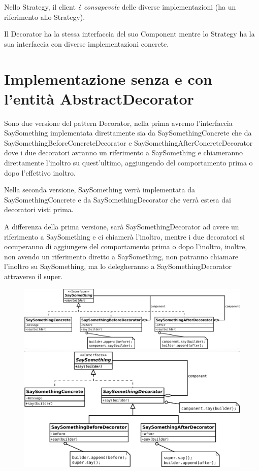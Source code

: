 Nello Strategy, il client \textit{è consapevole} delle diverse implementazioni (ha un riferimento allo Strategy).
\smallskip

Il Decorator ha la stessa interfaccia del suo Component mentre lo Strategy ha la sua interfaccia con diverse implementazioni concrete.

\section{Implementazione senza e con l'entità AbstractDecorator}

Sono due versione del pattern Decorator, nella prima avremo l'interfaccia SaySomething implementata direttamente sia da SaySomethingConcrete che da 
SaySomethingBeforeConcreteDecorator e SaySomethingAfterConcreteDecorator dove i due decoratori avranno un riferimento a SaySomething e chiameranno direttamente 
l'inoltro su quest'ultimo, aggiungendo del comportamento prima o dopo l'effettivo inoltro.

Nella seconda versione, SaySomething verrà implementata da SaySomethingConcrete e da SaySomethingDecorator che verrà estesa dai decoratori visti prima.

A differenza della prima versione, sarà SaySomethingDecorator ad avere un riferimento a SaySomething e ci chiamerà l'inoltro, mentre i due decoratori si occuperanno di 
aggiungere del comportamento prima o dopo l'inoltro, inoltre, non avendo un riferimento diretto a SaySomething, non potranno chiamare l'inoltro su SaySomething, ma lo 
delegheranno a SaySomethingDecorator attraverso il super.

\begin{figure}[H]
\begin{minipage}[c]{9cm}
    \includegraphics[width=1\linewidth]{../../immagini/decorator/senza_AbstractDecorator}
\end{minipage}
\hfill
\begin{minipage}[c]{8cm}
    \includegraphics[width=1\linewidth]{../../immagini/decorator/con_AbstractDecorator}
\end{minipage}
\end{figure}

